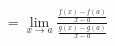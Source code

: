 \documentclass[preview]{standalone}
\begin{document}
\begin{align*}
= \lim_{x \to a} \frac{\frac{f(x) - f(a)}{x-a}}{\frac{g(x) - g(a)}{x-a}}
\end{align*}
\end{document}
